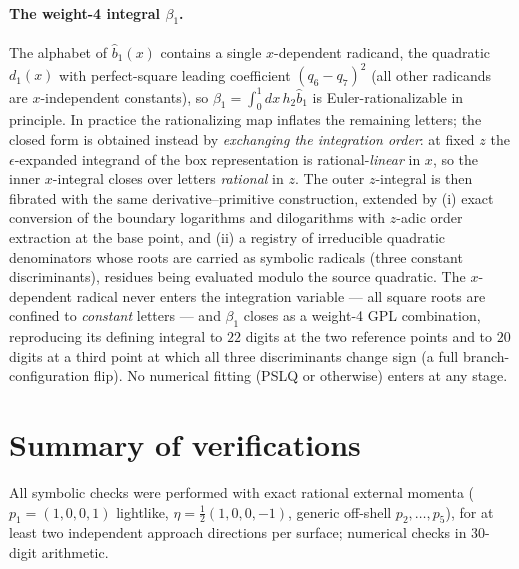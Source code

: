 \documentclass[11pt]{article}
\newcommand{\eps}{\epsilon}
\begin{document}
\paragraph{The weight-4 integral $\beta_1$.}
The alphabet of $\hat b_1(x)$ contains a single $x$-dependent radicand, the quadratic
$d_1(x)$ with perfect-square leading coefficient $(q_6-q_7)^2$ (all other radicands are
$x$-independent constants), so $\beta_1=\int_0^1dx\,h_2\hat b_1$ is Euler-rationalizable in
principle. In practice the rationalizing map inflates the remaining letters; the closed form is
obtained instead by \emph{exchanging the integration order}: at fixed $z$ the $\eps$-expanded
integrand of the box representation is rational-\emph{linear} in $x$, so the inner $x$-integral
closes over letters \emph{rational} in $z$. The outer $z$-integral is then fibrated with the same
derivative--primitive construction, extended by (i) exact conversion of the boundary logarithms
and dilogarithms with $z$-adic order extraction at the base point, and (ii) a registry of
irreducible quadratic denominators whose roots are carried as symbolic radicals (three constant
discriminants), residues being evaluated modulo the source quadratic. The $x$-dependent radical
never enters the integration variable --- all square roots are confined to \emph{constant}
letters --- and $\beta_1$ closes as a weight-4 GPL combination, reproducing its defining integral
to $22$ digits at the two reference points and to $20$ digits at a third point at which all three
discriminants change sign (a full branch-configuration flip). No numerical fitting (PSLQ or
otherwise) enters at any stage.

\section{Summary of verifications}
\label{sec:verif}

All symbolic checks were performed with exact rational external momenta
($p_1=(1,0,0,1)$ lightlike, $\eta=\tfrac12(1,0,0,-1)$, generic off-shell $p_2,\dots,p_5$), for at
least two independent approach directions per surface; numerical checks in 30-digit arithmetic.
\end{document}

